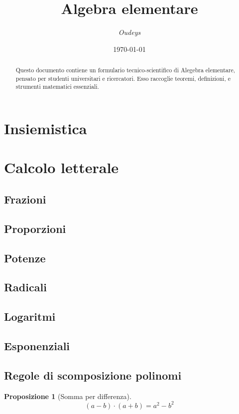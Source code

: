 \documentclass[a4paper,12pt]{article}
\title{\textbf{Algebra elementare}}
\author{\textit{Oudeys}}
\date{\today}
\theoremstyle{mystyle}
\newtheorem{proposition}[theorem]{Proposizione}
\begin{document}
\maketitle

\begin{abstract}
    Questo documento contiene un formulario tecnico-scientifico di Alegebra elementare, pensato per studenti universitari e ricercatori. Esso raccoglie teoremi, definizioni, e strumenti matematici essenziali.
\end{abstract}

\tableofcontents
\newpage

\section{Insiemistica}


\section{Calcolo letterale}
\subsection{Frazioni}
\subsection{Proporzioni}
\subsection{Potenze}
\subsection{Radicali}
\subsection{Logaritmi}
\subsection{Esponenziali}

\subsection{Regole di scomposizione polinomi}
\begin{proposition}[Somma per differenza]
    \[(a-b) \cdot (a+b) = a^2 - b^2 \]
\end{proposition}
\end{document}
